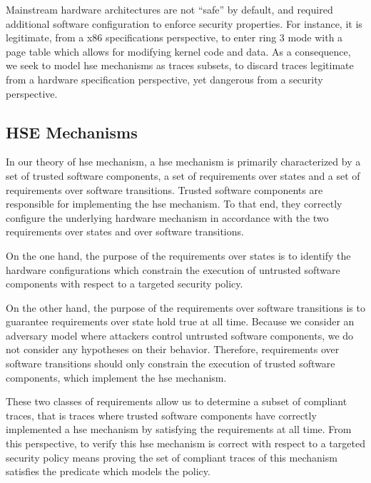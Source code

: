 Mainstream hardware architectures are not ``safe'' by default, and required
additional software configuration to enforce security properties.
%
For instance, it is legitimate, from a x86 specifications perspective, to enter
ring 3 mode with a page table which allows for modifying kernel code and data.
%
As a consequence, we seek to model \ac{hse} mechanisms as traces subsets, to
discard traces legitimate from a hardware specification perspective, yet
dangerous from a security perspective.

\subsection{HSE Mechanisms}
\label{subsec:speccert:hse}

In our theory of \ac{hse} mechanism, a \ac{hse} mechanism is primarily
characterized by a set of trusted software components, a set of requirements
over states and a set of requirements over software transitions.
%
Trusted software components are responsible for implementing the \ac{hse}
mechanism.
%
To that end, they correctly configure the underlying hardware mechanism in
accordance with the two requirements over states and over software transitions.

On the one hand, the purpose of the requirements over states is to identify the
hardware configurations which constrain the execution of untrusted software
components with respect to a targeted security policy.

On the other hand, the purpose of the requirements over software transitions is
to guarantee requirements over state hold true at all time.
%
Because we consider an adversary model where attackers control untrusted
software components, we do not consider any hypotheses on their behavior.
%
Therefore, requirements over software transitions should only constrain the
execution of trusted software components, which implement the \ac{hse}
mechanism.

These two classes of requirements allow us to determine a subset of compliant
traces, that is traces where trusted software components have correctly
implemented a \ac{hse} mechanism by satisfying the requirements at all time.
%
%
From this perspective, to verify this \ac{hse} mechanism is correct with respect
to a targeted security policy means proving the set of compliant traces of this
mechanism satisfies the predicate which models the policy.

